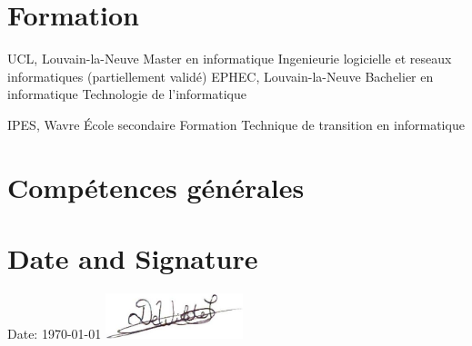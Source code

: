 \documentclass[%
    doublesided,
    paper=a4,
    fontsize=10pt,
    hidelinks
]{my-resume}
\begin{document}
{    \section[\faMortarBoard]{Formation}
    {UCL, Louvain-la-Neuve}
    {Master en informatique}
    {Ingenieurie logicielle et reseaux informatiques (partiellement validé)}
    {EPHEC, Louvain-la-Neuve}
    {Bachelier en informatique}
    {Technologie de l'informatique}

    {IPES, Wavre}
    {École secondaire}
    {Formation Technique de transition en informatique}

    \section{Compétences générales}
    \smallskip %

    \section{Date and Signature}
    Date:  \today
    \hspace{1cm}
    \includegraphics[width=4cm]{signature}
}
    \makebody
\end{document}
